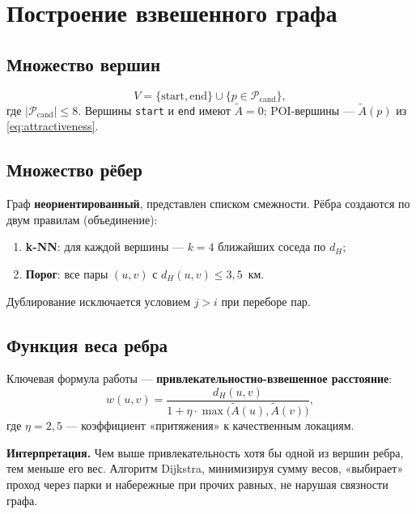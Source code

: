 \section{Построение взвешенного графа}

\subsection{Множество вершин}

\begin{equation}
  V = \{\mathrm{start}, \mathrm{end}\} \cup \{p \in \mathcal{P}_\mathrm{cand}\},
  \label{eq:vertices}
\end{equation}
где $|\mathcal{P}_\mathrm{cand}| \leq 8$. Вершины \texttt{start} и \texttt{end}
имеют $\tilde{A} = 0$; POI-вершины --- $\tilde{A}(p)$ из \eqref{eq:attractiveness}.

\subsection{Множество рёбер}

Граф \textbf{неориентированный}, представлен списком смежности. Рёбра создаются по
двум правилам (объединение):
\begin{enumerate}
  \item \textbf{k-NN}: для каждой вершины --- $k = 4$ ближайших соседа по $d_H$;
  \item \textbf{Порог}: все пары $(u, v)$ с $d_H(u, v) \leq 3{,}5$~км.
\end{enumerate}

Дублирование исключается условием $j > i$ при переборе пар.

\subsection{Функция веса ребра}

Ключевая формула работы --- \textbf{привлекательностно-взвешенное расстояние}:
\begin{equation}
  w(u, v) = \frac{d_H(u, v)}{1 + \eta \cdot \max\bigl(\tilde{A}(u), \tilde{A}(v)\bigr)},
  \label{eq:edge-weight}
\end{equation}
где $\eta = 2{,}5$ --- коэффициент «притяжения» к качественным локациям.

\textbf{Интерпретация.} Чем выше привлекательность хотя бы одной из вершин ребра,
тем меньше его вес. Алгоритм Dijkstra, минимизируя сумму весов, «выбирает» проход
через парки и набережные при прочих равных, не нарушая связности графа.

